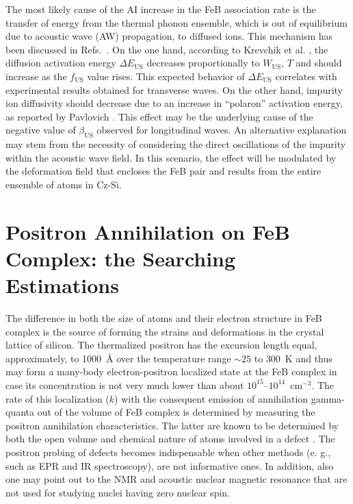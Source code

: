 \documentclass{ttp}
\begin{document}
The most likely cause \cite{Olikh2021JAP} of the AI increase in the FeB association rate
is the transfer of energy from the thermal phonon ensemble,
which is out of equilibrium due to acoustic wave (AW) propagation, to diffused ions.
This mechanism has been discussed in Refs.~\cite{Pavlovich, Krevchik}.
On the one hand, according to Krevchik et al. \cite{Krevchik},
the diffusion activation energy $\Delta E_\mathrm{US}$ decreases proportionally
to $W_\mathrm{US}$, $T$ and should increase as the $f_\mathrm{US}$ value rises.
This expected behavior of $\Delta E_\mathrm{US}$  correlates with experimental results obtained for transverse waves.
On the other hand, impurity ion diffusivity should decrease due to an increase in
``polaron'' activation energy, as reported by Pavlovich \cite{Pavlovich}.
This effect may be the underlying cause of the negative value of $\beta_\mathrm{US}$ observed for longitudinal waves.
An alternative explanation may stem from the necessity of considering the direct oscillations of the impurity within the acoustic wave field.
In this scenario, the effect will be modulated by the deformation field that encloses the FeB pair
and results from the entire ensemble of atoms in Cz-Si.


\section{Positron Annihilation on FeB Complex: the Searching Estimations}

The difference in both the size of atoms and their electron structure in FeB complex
is the source of forming the strains and deformations in the crystal lattice of silicon.
The thermalized positron has the excursion length \cite{Krause1999} equal,
approximately, to 1000~{\AA} over the temperature range $\sim25$ to $300$~K
and thus may form a many-body electron-positron localized state at the
FeB complex in case its concentration is not very much lower than about $10^{15} – 10^{14}$~cm$^{−3}$.
The rate of this localization ($k$) with the consequent emission of annihilation
gamma-quanta out of the volume of FeB complex is determined by measuring the positron annihilation characteristics.
The latter are known to be determined by both the open volume and chemical nature of atoms involved in a defect \cite{Krause1999}.
The positron probing of defects becomes indispensable when other methods
(e. g., such as EPR and IR spectroscopy), are not informative ones.
In addition, also one may point out to the NMR and acoustic nuclear magnetic resonance
that are not used for studying nuclei having zero nuclear spin.
\end{document}
